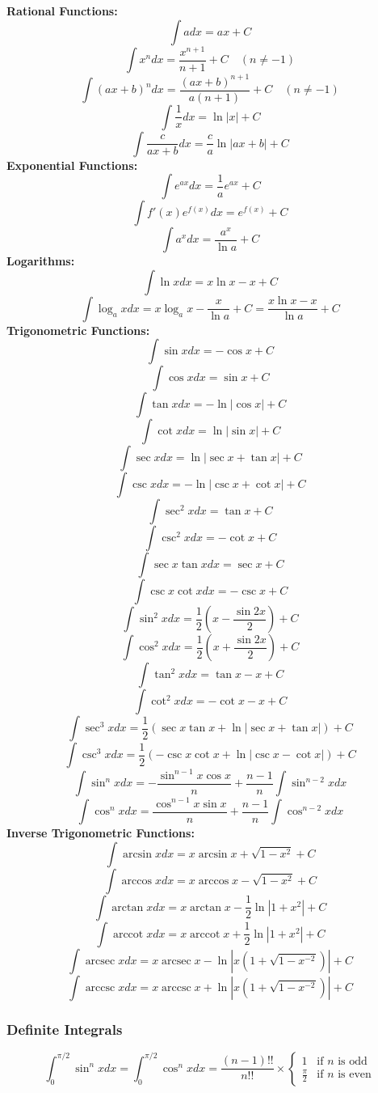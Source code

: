 \documentclass{article}
\begin{document}
\textbf{Rational Functions:}
\[
    \int a dx = ax + C
\]
\[
    \int x^n dx = \frac{x^{n+1}}{n+1} + C \quad (n \neq -1)
\]
\[
    \int (ax + b)^n dx = \frac{(ax + b)^{n+1}}{a(n+1)} + C \quad (n \neq -1)
\]
\[
    \int \frac{1}{x} dx = \ln|x| + C
\]
\[
    \int \frac{c}{ax + b} dx = \frac{c}{a} \ln|ax + b| + C
\]
\textbf{Exponential Functions:}
\[
    \int e^{ax} dx = \frac{1}{a} e^{ax} + C
\]
\[
    \int f'(x) e^{f(x)} dx = e^{f(x)} + C
\]
\[
    \int a^x dx = \frac{a^x}{\ln a} + C
\]
\textbf{Logarithms:}
\[
    \int \ln x dx = x \ln x - x + C
\]
\[
    \int \log_a x dx = x \log_a x - \frac{x}{\ln a} + C = \frac{x \ln x - x}{\ln a} + C
\]
\textbf{Trigonometric Functions:}
\[
    \int \sin x dx = -\cos x + C
\]
\[
    \int \cos x dx = \sin x + C
\]
\[
    \int \tan x dx = -\ln|\cos x| + C
\]
\[
    \int \cot x dx = \ln|\sin x| + C
\]
\[
    \int \sec x dx = \ln|\sec x + \tan x| + C
\]
\[
    \int \csc x dx = -\ln|\csc x + \cot x| + C
\]
\[
    \int \sec^2 x dx = \tan x + C
\]
\[
    \int \csc^2 x dx = -\cot x + C
\]
\[
    \int \sec x \tan x dx = \sec x + C
\]
\[
    \int \csc x \cot x dx = -\csc x + C
\]
\[
    \int \sin^2 x dx = \frac{1}{2}\left(x - \frac{\sin 2x}{2}\right) + C
\]
\[
    \int \cos^2 x dx = \frac{1}{2}\left(x + \frac{\sin 2x}{2}\right) + C
\]
\[
    \int \tan^2 x dx = \tan x - x + C
\]
\[
    \int \cot^2 x dx = -\cot x - x + C
\]
\[
    \int \sec^3 x dx = \frac{1}{2}\left(\sec x \tan x + \ln|\sec x + \tan x|\right) + C
\]
\[
    \int \csc^3 x dx = \frac{1}{2}\left(-\csc x \cot x + \ln|\csc x - \cot x|\right) + C
\]
\[
    \int \sin^n x dx = -\frac{\sin^{n-1} x \cos x}{n} + \frac{n-1}{n} \int \sin^{n-2} x dx
\]
\[
    \int \cos^n x dx = \frac{\cos^{n-1} x \sin x}{n} + \frac{n-1}{n} \int \cos^{n-2} x dx
\]
\textbf{Inverse Trigonometric Functions:}
\[
    \int \arcsin x dx = x \arcsin x + \sqrt{1 - x^2} + C
\]
\[
    \int \arccos x dx = x \arccos x - \sqrt{1 - x^2} + C
\]
\[
    \int \arctan x dx = x \arctan x - \frac{1}{2} \ln|1 + x^2| + C
\]
\[
    \int \operatorname{arccot} x dx = x \operatorname{arccot} x + \frac{1}{2} \ln|1 + x^2| + C
\]
\[
    \int \operatorname{arcsec} x dx = x \operatorname{arcsec} x - \ln|x(1 + \sqrt{1 - x^{-2}})| + C
\]
\[
    \int \operatorname{arccsc} x dx = x \operatorname{arccsc} x + \ln|x(1 + \sqrt{1 - x^{-2}})| + C
\]

\subsubsection{Definite Integrals}

\[
    \int_0^{\pi/2} \sin^n x dx = \int_0^{\pi/2} \cos^n x dx = \frac{(n-1)!!}{n!!} \times
    \begin{cases}
        1 & \text{if } n \text{ is odd} \\
        \frac{\pi}{2} & \text{if } n \text{ is even}
    \end{cases}
\]
\end{document}
